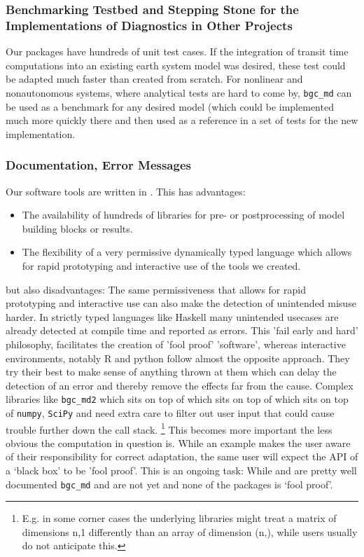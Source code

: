 \subsubsection{Benchmarking Testbed and Stepping Stone for the Implementations of Diagnostics in Other Projects}
Our packages have hundreds of unit test cases. If the integration of transit time computations into an existing earth system model was desired, these test could be adapted
much faster than created from scratch. For nonlinear and nonautonomous systems, where analytical tests are hard to come by, \texttt{bgc\_md} can be used as a benchmark for any desired model (which could be implemented much more quickly there and then used as a reference in a set of tests for the new implementation.

\subsubsection{Documentation, Error Messages}
Our software tools are written in \python{}. 
This has advantages:
\begin{itemize}
  \item
  The availability of hundreds of libraries for pre-  or postprocessing of model building blocks or results.
  \item
  The flexibility of a very permissive dynamically typed language which allows for rapid prototyping and interactive use of the tools we created.
\end{itemize}
but also disadvantages: The same permissiveness that allows for rapid prototyping and interactive use can also make the detection of unintended misuse harder.
In strictly typed languages like Haskell many unintended usecases are already detected at compile time and reported as errors.
This 'fail early and hard' philosophy, facilitates the creation of 'fool proof'
'software', whereas interactive environments, notably  R and python follow
almost the opposite approach.  They try their best to make sense of anything
thrown at them which can delay the detection of an error and thereby remove the effects far from the cause.
Complex libraries like \texttt{bgc\_md2} which sits on top of \CompartmentalSystems{} which sits on top of \LAPM{} which sits on top of \texttt{numpy}, \texttt{SciPy} and \sympy{}
need extra care to filter out user input that could cause trouble further down the call stack. 
\footnote{E.g. in some corner cases the underlying libraries might treat a matrix of dimensions n,1 differently than an array of dimension (n,), while users usually do not anticipate this.} This becomes more important the less obvious the computation in question is. 
While an example makes the user aware of their responsibility for correct adaptation, the same user will expect the API of a `black box' to be 'fool proof'. 
This is an ongoing task: While \LAPM{} and \CompartmentalSystems{} are pretty well documented 
\texttt{bgc\_md} and \ComputabilityGraphs{} are not yet and none of the packages is `fool proof'. 

